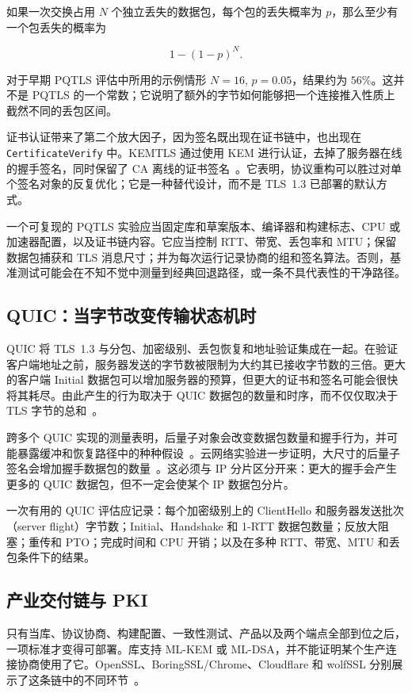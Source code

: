 如果一次交换占用 $N$ 个独立丢失的数据包，每个包的丢失概率为 $p$，那么至少有一个包丢失的概率为

\[
  1-(1-p)^N.
\]

对于早期 PQTLS 评估中所用的示例情形 $N=16$, $p=0.05$，结果约为 $56\%$。这并不是 PQTLS 的一个常数；它说明了额外的字节如何能够把一个连接推入性质上截然不同的丢包区间。

证书认证带来了第二个放大因子，因为签名既出现在证书链中，也出现在 \texttt{CertificateVerify} 中。KEMTLS 通过使用 KEM 进行认证，去掉了服务器在线的握手签名，同时保留了 CA 离线的证书签名~\cite{kemtls2020}。它表明，协议重构可以胜过对单个签名对象的反复优化；它是一种替代设计，而不是 TLS~1.3 已部署的默认方式。

一个可复现的 PQTLS 实验应当固定库和草案版本、编译器和构建标志、CPU 或加速器配置，以及证书链内容。它应当控制 RTT、带宽、丢包率和 MTU；保留数据包捕获和 TLS 消息尺寸；并为每次运行记录协商的组和签名算法。否则，基准测试可能会在不知不觉中测量到经典回退路径，或一条不具代表性的干净路径。

\subsection{QUIC：当字节改变传输状态机时}

QUIC 将 TLS~1.3 与分包、加密级别、丢包恢复和地址验证集成在一起。在验证客户端地址之前，服务器发送的字节数被限制为大约其已接收字节数的三倍。更大的客户端 Initial 数据包可以增加服务器的预算，但更大的证书和签名可能会很快将其耗尽。由此产生的行为取决于 QUIC 数据包的数量和时序，而不仅仅取决于 TLS 字节的总和~\cite{rfc9000}。

跨多个 QUIC 实现的测量表明，后量子对象会改变数据包数量和握手行为，并可能暴露缓冲和恢复路径中的种种假设~\cite{quantumquic2024}。云网络实验进一步证明，大尺寸的后量子签名会增加握手数据包的数量~\cite{pqquiccloud2023}。这必须与 IP 分片区分开来：更大的握手会产生更多的 QUIC 数据包，但不一定会使某个 IP 数据包分片。

一次有用的 QUIC 评估应记录：每个加密级别上的 ClientHello 和服务器发送批次（server flight）字节数；Initial、Handshake 和 1-RTT 数据包数量；反放大阻塞；重传和 PTO；完成时间和 CPU 开销；以及在多种 RTT、带宽、MTU 和丢包条件下的结果。

\subsection{产业交付链与 PKI}

只有当库、协议协商、构建配置、一致性测试、产品以及两个端点全部到位之后，一项标准才变得可部署。库支持 ML-KEM 或 ML-DSA，并不能证明某个生产连接协商使用了它。OpenSSL、BoringSSL/Chrome、Cloudflare 和 wolfSSL 分别展示了这条链中的不同环节~\cite{opensslpq2026,chromekyber2024,cloudflarepqmigration2026,wolfsslpq}。

